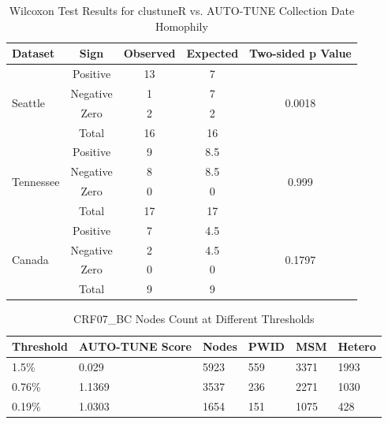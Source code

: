 \documentclass[utf8]{FrontiersinHarvard} %
\begin{document}
\begin{table}[h]
	\centering
	\caption{Wilcoxon Test Results for clustuneR vs. AUTO-TUNE Collection Date Homophily}
	\label{table:wilcoxon-test}
	\begin{tabular}{lcccc}
		\hline
		\textbf{Dataset}           & \textbf{Sign} & \textbf{Observed} & \textbf{Expected} & \textbf{Two-sided p Value} \\
		\hline
		\multirow{4}{*}{Seattle}   & Positive      & 13                & 7                 & \multirow{4}{*}{0.0018}    \\
		                           & Negative      & 1                 & 7                 &                            \\
		                           & Zero          & 2                 & 2                 &                            \\
		                           & Total         & 16                & 16                &                            \\
		\hline
		\multirow{4}{*}{Tennessee} & Positive      & 9                 & 8.5               & \multirow{4}{*}{0.999}     \\
		                           & Negative      & 8                 & 8.5               &                            \\
		                           & Zero          & 0                 & 0                 &                            \\
		                           & Total         & 17                & 17                &                            \\
		\hline
		\multirow{4}{*}{Canada}    & Positive      & 7                 & 4.5               & \multirow{4}{*}{0.1797}    \\
		                           & Negative      & 2                 & 4.5               &                            \\
		                           & Zero          & 0                 & 0                 &                            \\
		                           & Total         & 9                 & 9                 &                            \\
		\hline
	\end{tabular}
\end{table}

\begin{table}[h!]
	\centering
	\begin{tabularx}{\textwidth}{|X|X|X|X|X|X|}
		\hline
		Threshold & AUTO-TUNE Score & Nodes & PWID & MSM  & Hetero \\
		\hline
		1.5\%     & 0.029           & 5923  & 559  & 3371 & 1993   \\
		0.76\%    & 1.1369          & 3537  & 236  & 2271 & 1030   \\
		0.19\%    & 1.0303          & 1654  & 151  & 1075 & 428    \\
		\hline
	\end{tabularx}
	\caption{CRF07\_BC Nodes Count at Different Thresholds}
	\label{table:combined}
\end{table}
\end{document}
